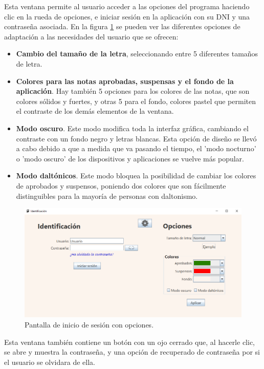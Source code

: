 Esta ventana permite al usuario acceder a las opciones del programa haciendo clic en la rueda de opciones, e iniciar sesión en la aplicación con su DNI y una contraseña asociada. En la figura \ref{Fig:loginopciones} se pueden ver las diferentes opciones de adaptación a las necesidades del usuario que se ofrecen:
\begin{itemize}
	\item \textbf{Cambio del tamaño de la letra}, seleccionando entre 5 diferentes tamaños de letra.
	\item \textbf{Colores para las notas aprobadas, suspensas y el fondo de la aplicación}. Hay también 5 opciones para los colores de las notas, que son colores sólidos y fuertes, y otras 5 para el fondo, colores pastel que permiten el contraste de los demás elementos de la ventana.
	\item \textbf{Modo oscuro}. Este modo modifica toda la interfaz gráfica, cambiando el contraste con un fondo negro y letras blancas. Esta opción de diseño se llevó a cabo debido a que a medida que va pasando el tiempo, el 'modo nocturno' o 'modo oscuro' de los dispositivos y aplicaciones se vuelve más popular.
	\item \textbf{Modo daltónicos}. Este modo bloquea la posibilidad de cambiar los colores de aprobados y suspensos, poniendo dos colores que son fácilmente distinguibles para la mayoría de personas con daltonismo.
\end{itemize}

\begin{figure}[h]
\centering\includegraphics[width=1\linewidth]{figs/loginopciones.png}
\caption{Pantalla de inicio de sesión con opciones.}
\label{Fig:loginopciones}
\end{figure}

Esta ventana también contiene un botón con un ojo cerrado que, al hacerle clic, se abre y muestra la contraseña, y una opción de recuperado de contraseña por si el usuario se olvidara de ella.


